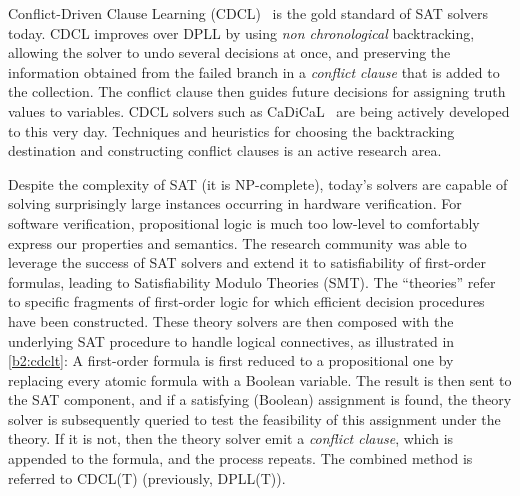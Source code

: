 Conflict-Driven Clause Learning (CDCL)~\cite{CDCL} is the gold standard of SAT solvers today.
CDCL improves over DPLL by using \emph{non chronological} backtracking, allowing the solver to undo several decisions at once, and preserving the information obtained from the failed branch in a \emph{conflict clause} that is added to the collection.
The conflict clause then guides future decisions for assigning truth values to variables.
CDCL solvers such as CaDiCaL~\cite{SAT2020:CaDiCaL} are being actively developed to this very day.
Techniques and heuristics for choosing the backtracking destination and constructing conflict clauses is an active research area.

Despite the complexity of SAT (it is NP-complete), today's solvers are capable of solving surprisingly large instances occurring in hardware verification.
For software verification, propositional logic is much too low-level to comfortably express our properties and semantics.
The research community was able to leverage the success of SAT solvers and extend it to satisfiability of first-order formulas, leading to Satisfiability Modulo Theories (SMT).
The ``theories'' refer to specific fragments of first-order logic for which efficient decision procedures have been constructed.
These theory solvers are then composed with the underlying SAT procedure to handle logical connectives, as illustrated in \autoref{b2:cdclt}:
A first-order formula is first reduced to a propositional one by replacing every atomic formula with a Boolean variable.
The result is then sent to the SAT component,
and if a satisfying (Boolean) assignment is found,
the theory solver is subsequently queried to test the feasibility of this assignment under the theory.
If it is not, then the theory solver emit a \emph{conflict clause}, which is appended to the formula, and the process repeats.
The combined method is referred to CDCL(T) (previously, DPLL(T)).
